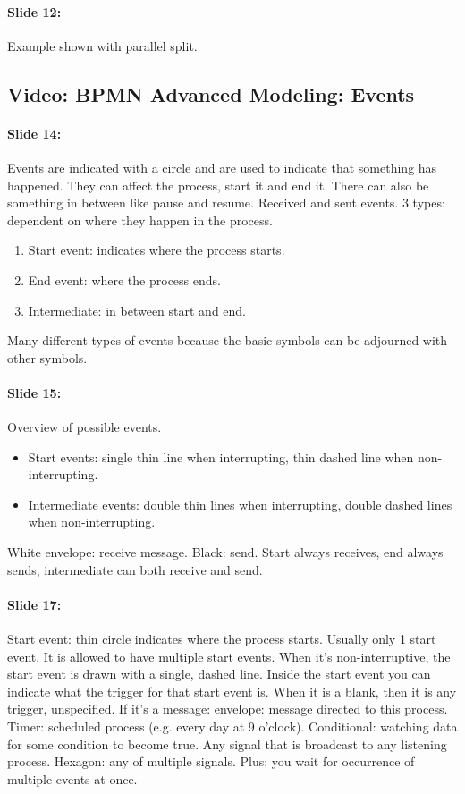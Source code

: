 \documentclass[10pt,a4paper]{report}
\begin{document}
\paragraph{Slide 12:}Example shown with parallel split.

\subsection{Video: BPMN Advanced Modeling: Events}

\paragraph{Slide 14:}Events are indicated with a circle and are used to indicate that something has happened. They can affect the process, start it and end it. There can also be something in between like pause and resume. Received and sent events. 3 types: dependent on where they happen in the process. 
\begin{enumerate}
\item Start event: indicates where the process starts. 
\item End event: where the process ends. 
\item Intermediate: in between start and end.
\end{enumerate} 
Many different types of events because the basic symbols can be adjourned with other symbols.

\paragraph{Slide 15:}Overview of possible events. 
\begin{itemize}
\item Start events: single thin line when interrupting, thin dashed line when non-interrupting. 
\item Intermediate events: double thin lines when interrupting, double dashed lines when non-interrupting.
\end{itemize}
White envelope: receive message. Black: send. Start always receives, end always sends, intermediate can both receive and send.

\paragraph{Slide 17:}Start event: thin circle indicates where the process starts. Usually only 1 start event. It is allowed to have multiple start events. When it's non-interruptive, the start event is drawn with a single, dashed line. Inside the start event you can indicate what the trigger for that start event is. When it is a blank, then it is any trigger, unspecified. If it's a message: envelope: message directed to this process. Timer: scheduled process (e.g. every day at 9 o'clock). Conditional: watching data for some condition to become true. Any signal that is broadcast to any listening process. Hexagon: any of multiple signals. Plus: you wait for occurrence of multiple events at once.
\end{document}
